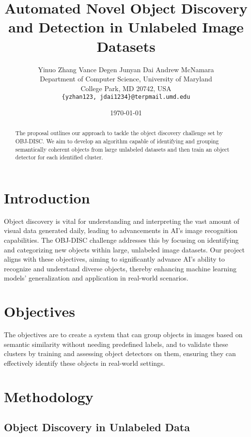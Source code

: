 \documentclass{article}
\title{Automated Novel Object Discovery and Detection in Unlabeled Image Datasets}
\author{%
	Yinuo Zhang \AND Vance Degen \AND Junyan Dai \AND Andrew McNamara\\
	Department of Computer Science, University of Maryland\\
	College Park, MD 20742, USA\\
	\texttt{\{yzhan123, jdai1234\}@terpmail.umd.edu}}
\date{\today}
\begin{document}
	
	
	\maketitle
	
	
	\begin{abstract}
		The proposal outlines our approach to tackle the object discovery challenge set by OBJ-DISC. We aim to develop an algorithm capable of identifying and grouping semantically coherent objects from large unlabeled datasets and then train an object detector for each identified cluster.
	\end{abstract}
	
	
	\section{Introduction}
	
	
	Object discovery is vital for understanding and interpreting the vast amount of visual data generated daily, leading to advancements in AI's image recognition capabilities. The OBJ-DISC challenge addresses this by focusing on identifying and categorizing new objects within large, unlabeled image datasets. Our project aligns with these objectives, aiming to significantly advance AI's ability to recognize and understand diverse objects, thereby enhancing machine learning models' generalization and application in real-world scenarios.
	
	
	\section{Objectives}

	
	The objectives are to create a system that can group objects in images based on semantic similarity without needing predefined labels, and to validate these clusters by training and assessing object detectors on them, ensuring they can effectively identify these objects in real-world settings.
	
	
	\section{Methodology}
	\label{methodology}
	
	
	
	\subsection{Object Discovery in Unlabeled Data}
	
\end{document}
